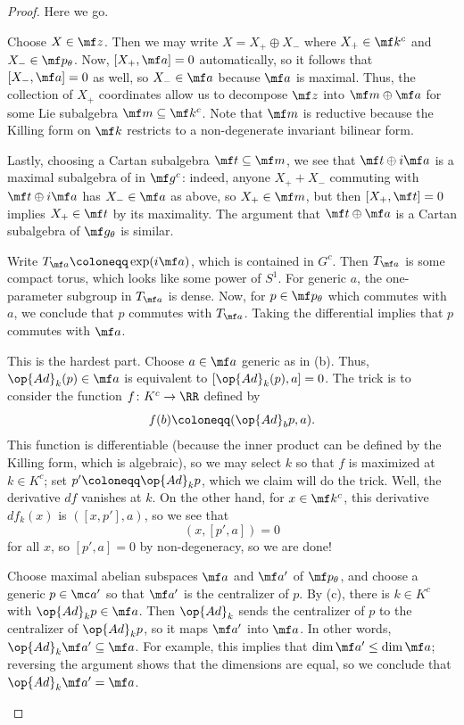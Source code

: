 \documentclass[../notes.tex]{subfiles}
\begin{document}
\begin{proof}
	Here we go.
	\begin{listalph}
		\item Choose $X\in\mf z$. Then we may write $X=X_+\oplus X_-$ where $X_+\in\mf k^c$ and $X_-\in\mf p_\theta$. Now, $[X_+,\mf a]=0$ automatically, so it follows that $[X_-,\mf a]=0$ as well, so $X_-\in\mf a$ because $\mf a$ is maximal. Thus, the collection of $X_+$ coordinates allow us to decompose $\mf z$ into $\mf m\oplus\mf a$ for some Lie subalgebra $\mf m\subseteq\mf k^c$. Note that $\mf m$ is reductive because the Killing form on $\mf k$ restricts to a non-degenerate invariant bilinear form.

		Lastly, choosing a Cartan subalgebra $\mf t\subseteq\mf m$, we see that $\mf t\oplus i\mf a$ is a maximal subalgebra of in $\mf g^c$: indeed, anyone $X_++X_-$ commuting with $\mf t\oplus i\mf a$ has $X_-\in\mf a$ as above, so $X_+\in\mf m$, but then $[X_+,\mf t]=0$ implies $X_+\in\mf t$ by its maximality. The argument that $\mf t\oplus\mf a$ is a Cartan subalgebra of $\mf g_\theta$ is similar.

		\item Write $T_{\mf a}\coloneqq\exp(i\mf a)$, which is contained in $G^c$. Then $T_{\mf a}$ is some compact torus, which looks like some power of $S^1$. For generic $a$, the one-parameter subgroup in $T_{\mf a}$ is dense. Now, for $p\in\mf p_\theta$ which commutes with $a$, we conclude that $p$ commutes with $T_{\mf a}$. Taking the differential implies that $p$ commutes with $\mf a$.

		\item This is the hardest part. Choose $a\in\mf a$ generic as in (b). Thus, $\op{Ad}_k(p)\in\mf a$ is equivalent to $[\op{Ad}_k(p),a]=0$. The trick is to consider the function $f\colon K^c\to\RR$ defined by
		\[f(b)\coloneqq(\op{Ad}_bp,a).\]
		This function is differentiable (because the inner product can be defined by the Killing form, which is algebraic), so we may select $k$ so that $f$ is maximized at $k\in K^c$; set $p'\coloneqq\op{Ad}_kp$, which we claim will do the trick. Well, the derivative $df$ vanishes at $k$. On the other hand, for $x\in\mf k^c$, this derivative $df_k(x)$ is $([x,p'],a)$, so we see that
		\[(x,[p',a])=0\]
		for all $x$, so $[p',a]=0$ by non-degeneracy, so we are done!

		\item Choose maximal abelian subspaces $\mf a$ and $\mf a'$ of $\mf p_\theta$, and choose a generic $p\in\mc a'$ so that $\mf a'$ is the centralizer of $p$. By (c), there is $k\in K^c$ with $\op{Ad}_kp\in\mf a$. Then $\op{Ad}_k$ sends the centralizer of $p$ to the centralizer of $\op{Ad}_kp$, so it maps $\mf a'$ into $\mf a$. In other words, $\op{Ad}_k\mf a'\subseteq\mf a$. For example, this implies that $\dim\mf a'\le\dim\mf a$; reversing the argument shows that the dimensions are equal, so we conclude that $\op{Ad}_k\mf a'=\mf a$.
		\qedhere
	\end{listalph}
\end{proof}
\end{document}
